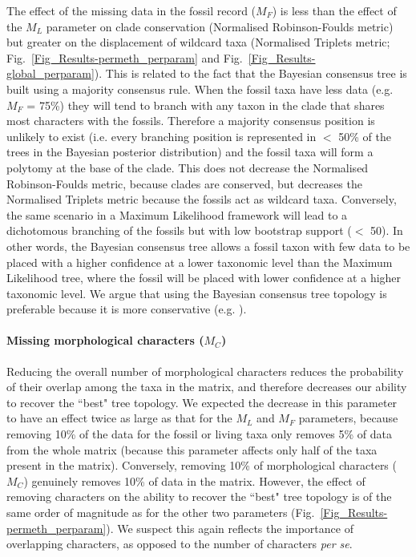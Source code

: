 \documentclass[10pt,letterpaper]{article}
\begin{document}
The effect of the missing data in the fossil record ($M_{F}$) is less than the effect of the $M_{L}$ parameter on clade conservation (Normalised Robinson-Foulds metric) but greater on the displacement of wildcard taxa (Normalised Triplets metric; Fig.~\ref{Fig_Results-permeth_perparam} and Fig.~\ref{Fig_Results-global_perparam}). This is related to the fact that the Bayesian consensus tree is built using a majority consensus rule. When the fossil taxa have less data (e.g. $M_{F}$ = 75\%) they will tend to branch with any taxon in the clade that shares most characters with the fossils. Therefore a majority consensus position is unlikely to exist (i.e. every branching position is represented in $<$ 50\% of the trees in the Bayesian posterior distribution) and the fossil taxa will form a polytomy at the base of the clade. This does not decrease the Normalised Robinson-Foulds metric, because clades are conserved, but decreases the Normalised Triplets metric because the fossils act as wildcard taxa. Conversely, the same scenario in a Maximum Likelihood framework will lead to a dichotomous branching of the fossils but with low bootstrap support ($<$ 50). In other words, the Bayesian consensus tree allows a fossil taxon with few data to be placed with a higher confidence at a lower taxonomic level than the Maximum Likelihood tree, where the fossil will be placed with lower confidence at a higher taxonomic level. We argue that using the Bayesian consensus tree topology is preferable because it is more conservative (e.g. \cite{pattinsonphylogeny2014}).

\paragraph*{Missing morphological characters ($M_{C}$)}
Reducing the overall number of morphological characters reduces the probability of their overlap among the taxa in the matrix, and therefore decreases our ability to recover the ``best" tree topology. We expected the decrease in this parameter to have an effect twice as large as that for the $M_{L}$ and $M_{F}$ parameters, because removing 10\% of the data for the fossil or living taxa only removes 5\% of data from the whole matrix (because this parameter affects only half of the taxa present in the matrix). Conversely, removing 10\% of morphological characters ($M_{C}$) genuinely removes 10\% of data in the matrix. However, the effect of removing characters on the ability to recover the ``best" tree topology is of the same order of magnitude as for the other two parameters (Fig.~\ref{Fig_Results-permeth_perparam}). We suspect this again reflects the importance of overlapping characters, as opposed to the number of characters \textit{per se}.
\end{document}
